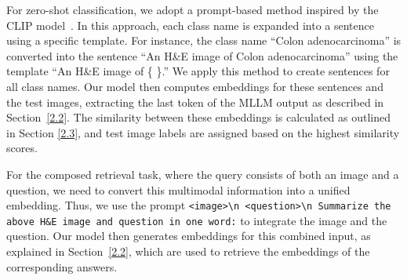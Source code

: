For zero-shot classification, we adopt a prompt-based method inspired by the CLIP model~\cite{radford2021learning}. 
In this approach, each class name is expanded into a sentence using a specific template. For instance, the class name ``Colon adenocarcinoma'' is converted into the sentence ``An H\&E image of Colon adenocarcinoma'' using the template ``An H\&E image of \{ \}.'' We apply this method to create sentences for all class names. Our model then computes embeddings for these sentences and the test images, extracting the last token of the MLLM output as described in Section~\ref{2.2}. The similarity between these embeddings is calculated as outlined in Section \ref{2.3}, and test image labels are assigned based on the highest similarity scores.

For the composed retrieval task, where the query consists of both an image and a question, we need to convert this multimodal information into a unified embedding. Thus, we use the prompt \texttt{<image>\textbackslash n <question>\textbackslash n Summarize the above H\&E image and question in one word:} to integrate the image and the question. Our model then generates embeddings for this combined input, as explained in Section~\ref{2.2}, which are used to retrieve the embeddings of the corresponding answers.
